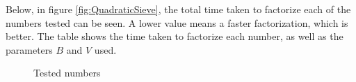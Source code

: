 Below, in figure \ref{fig:QuadraticSieve}, the total time taken to factorize each of the numbers tested can be seen. A lower value means a faster factorization, which is better. The table shows the time taken to factorize each number, as well as the parameters $B$ and $V$ used.



\begin{figure}[H]
\centering
{}
\vspace{-0.3cm}
\caption{Tested numbers}\label{fig:QuadraticSieveTable}
\end{figure}